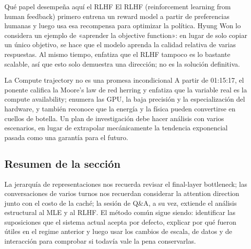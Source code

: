 \begin{knowledgebox}{Qué papel desempeña aquí el RLHF}
El RLHF (reinforcement learning from human feedback) primero entrena un reward model a partir de preferencias humanas y luego usa esa recompensa para optimizar la política. Hyung Won lo considera un ejemplo de «aprender la objective function»: en lugar de solo copiar un único objetivo, se hace que el modelo aprenda la calidad relativa de varias respuestas. Al mismo tiempo, enfatiza que el RLHF tampoco es lo bastante scalable, así que esto solo demuestra una dirección; no es la solución definitiva.
\end{knowledgebox}


\begin{warningbox}{La Compute trajectory no es una promesa incondicional}
A partir de 01:15:17, el ponente califica la Moore's law de red herring y enfatiza que la variable real es la compute availability; enumera las GPU, la baja precisión y la especialización del hardware, y también reconoce que la energía y la física pueden convertirse en cuellos de botella. Un plan de investigación debe hacer análisis con varios escenarios, en lugar de extrapolar mecánicamente la tendencia exponencial pasada como una garantía para el futuro.
\end{warningbox}

\subsection{Resumen de la sección}

La jerarquía de representaciones nos recuerda revisar el final-layer bottleneck; las conversaciones de varios turnos nos recuerdan considerar la attention direction junto con el costo de la caché; la sesión de Q\&A, a su vez, extiende el análisis estructural al MLE y al RLHF. El método común sigue siendo: identificar las suposiciones que el sistema actual acepta por defecto, explicar por qué fueron útiles en el regime anterior y luego usar los cambios de escala, de datos y de interacción para comprobar si todavía vale la pena conservarlas.
